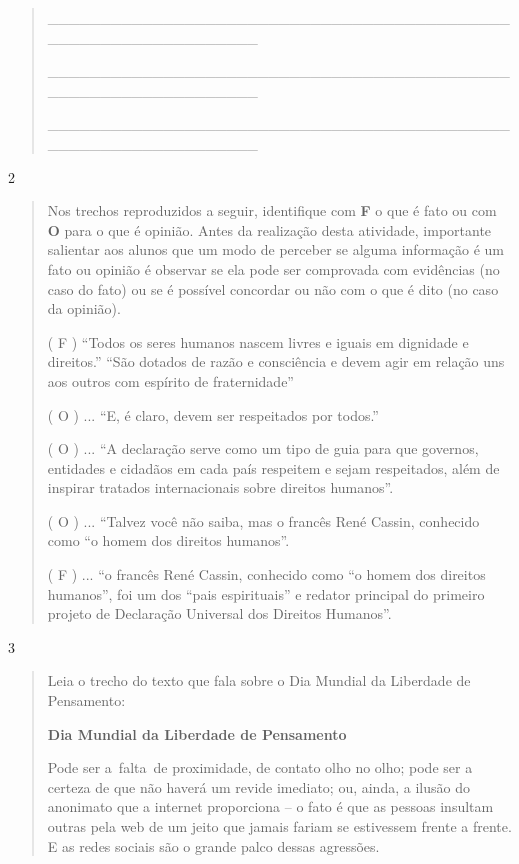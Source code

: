 \begin{itemize}
{{{\begin{itemize}
\begin{itemize}
\begin{itemize}
\begin{quote}
\protect\hypertarget{_Hlk128040463}{}{}\_\_\_\_\_\_\_\_\_\_\_\_\_\_\_\_\_\_\_\_\_\_\_\_\_\_\_\_\_\_\_\_\_\_\_\_\_\_\_\_\_\_\_\_\_\_\_\_\_\_\_\_\_\_\_\_\_\_\_\_\_\_\_\_

\_\_\_\_\_\_\_\_\_\_\_\_\_\_\_\_\_\_\_\_\_\_\_\_\_\_\_\_\_\_\_\_\_\_\_\_\_\_\_\_\_\_\_\_\_\_\_\_\_\_\_\_\_\_\_\_\_\_\_\_\_\_\_\_

\_\_\_\_\_\_\_\_\_\_\_\_\_\_\_\_\_\_\_\_\_\_\_\_\_\_\_\_\_\_\_\_\_\_\_\_\_\_\_\_\_\_\_\_\_\_\_\_\_\_\_\_\_\_\_\_\_\_\_\_\_\_\_\_
\end{quote}

\num{2}

\begin{quote}
Nos trechos reproduzidos a seguir, identifique com \textbf{F} o que é
fato ou com \textbf{O} para o que é opinião. Antes da realização desta
atividade, importante salientar aos alunos que um modo de perceber se
alguma informação é um fato ou opinião é observar se ela pode ser
comprovada com evidências (no caso do fato) ou se é possível concordar
ou não com o que é dito (no caso da opinião).

( F ) ``Todos os seres humanos nascem livres e iguais em dignidade e
direitos.'' ``São dotados de razão e consciência e devem agir em relação
uns aos outros com espírito de fraternidade''

( O ) ... ``E, é claro, devem ser respeitados por todos.''

( O ) ... ``A declaração serve como um tipo de guia para que governos,
entidades e cidadãos em cada país respeitem e sejam respeitados, além de
inspirar tratados internacionais sobre direitos humanos''.

( O ) ... ``Talvez você não saiba, mas o francês René Cassin, conhecido
como ``o homem dos direitos humanos''.

( F ) ... ``o francês René Cassin, conhecido como ``o homem dos direitos
humanos'', foi um dos ``pais espirituais'' e redator principal do
primeiro projeto de Declaração Universal dos Direitos Humanos''.
\end{quote}

\num{3}

\begin{quote}
Leia o trecho do texto que fala sobre o Dia Mundial da Liberdade de
Pensamento:

\textbf{Dia Mundial da Liberdade de Pensamento}

Pode ser a~falta~de proximidade, de contato olho no olho; pode ser a
certeza de que não haverá um revide imediato; ou, ainda, a ilusão do
anonimato que a internet proporciona -- o fato é que as pessoas insultam
outras pela web de um jeito que jamais fariam se estivessem frente a
frente. E as redes sociais são o grande palco dessas agressões.


\end{quote}
\end{itemize}
\end{itemize}
\end{itemize}}}}
\end{itemize}
